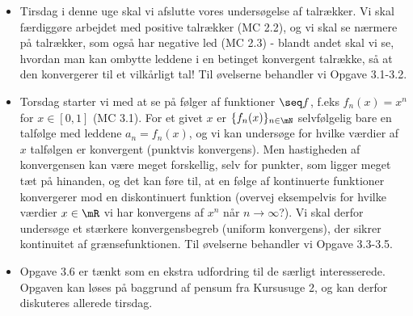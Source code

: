 \begin{itemize}
\item Tirsdag i denne uge skal vi afslutte vores undersøgelse af talrækker. Vi skal færdiggøre arbejdet med positive talrækker (MC 2.2), og vi skal se nærmere på talrækker, som også har negative led (MC 2.3) - blandt andet skal vi se, hvordan man kan ombytte leddene i en betinget konvergent talrække, så at den konvergerer til et vilkårligt tal! Til øvelserne behandler vi Opgave 3.1-3.2.

\item Torsdag starter vi med at se på følger af funktioner $\seq f$, f.eks $f_n(x)=x^n$ for $x \in [0,1]$ (MC 3.1). For et givet $x$ er $\{f_n(x) \}_{n \in \mN }$ selvfølgelig bare en talfølge med leddene $a_n=f_n(x)$, og vi kan undersøge for hvilke værdier af $x$ talfølgen er konvergent (punktvis konvergens). Men hastigheden af konvergensen kan være meget forskellig, selv for punkter, som ligger meget tæt på hinanden, og det kan føre til, at en følge af kontinuerte funktioner konvergerer mod en diskontinuert funktion (overvej eksempelvis for hvilke værdier $x\in\mR$ vi har konvergens af $x^n$ når $n\to\infty$?). Vi skal derfor undersøge et stærkere konvergensbegreb (uniform konvergens), der sikrer kontinuitet af grænsefunktionen. Til øvelserne behandler vi Opgave 3.3-3.5.

\item Opgave 3.6 er tænkt som en ekstra udfordring til de særligt interesserede. Opgaven kan løses på baggrund af pensum fra Kursusuge 2, og kan derfor diskuteres allerede tirsdag.
\end{itemize}

